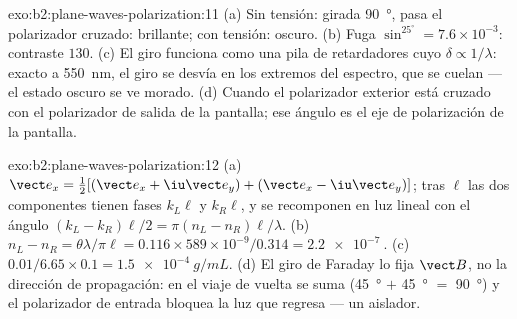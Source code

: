 \begin{solution}{exo:b2:plane-waves-polarization:11}
(a) Sin tensión: girada \qty{90}{\degree}, pasa el polarizador cruzado:
brillante; con tensión: oscuro. (b) Fuga $\sin^25^\circ = 7.6 \times 10^{-3}$: contraste
$130$. (c) El giro funciona como una pila de retardadores cuyo $\delta \propto 1/\lambda$:
exacto a \qty{550}{nm}, el giro se desvía en los extremos del espectro,
que se cuelan --- el estado oscuro se ve morado. (d) Cuando el
polarizador exterior está cruzado con el polarizador de salida de la
pantalla; ese ángulo es el eje de polarización de la pantalla.
\end{solution}

\begin{solution}{exo:b2:plane-waves-polarization:12}
(a) $\vect e_x = \tfrac12[(\vect e_x + \iu\vect e_y) + (\vect e_x - \iu\vect e_y)]$; tras $\ell$
las dos componentes tienen fases $k_L\ell$ y $k_R\ell$, y se recomponen en
luz lineal con el ángulo $(k_L - k_R)\ell/2 = \pi(n_L - n_R)\ell/\lambda$. (b) $n_L -
n_R = \theta\lambda/\pi\ell = 0.116 \times 589 \times 10^{-9}/0.314 = \qty{2.2e-7}{}$. (c)
$0.01/6.65 \times 0.1 = \qty{1.5e-4}{g/mL}$. (d) El giro de Faraday lo fija
$\vect B$, no la dirección de propagación: en el viaje de vuelta se suma
(\qty{45}{\degree} $+$ \qty{45}{\degree} $=$ \qty{90}{\degree}) y el polarizador de entrada bloquea
la luz que regresa --- un aislador.
\end{solution}

